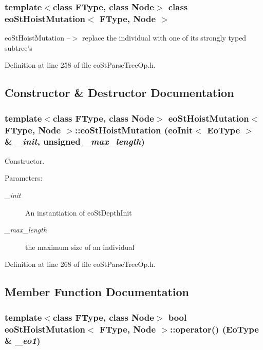 \subsubsection*{template$<$class FType, class Node$>$ class eo\-St\-Hoist\-Mutation$<$ FType, Node $>$}

eo\-St\-Hoist\-Mutation --$>$ replace the individual with one of its strongly typed subtree's 



Definition at line 258 of file eo\-St\-Parse\-Tree\-Op.h.

\subsection{Constructor \& Destructor Documentation}
\subsubsection{\setlength{\rightskip}{0pt plus 5cm}template$<$class FType, class Node$>$ {\bf eo\-St\-Hoist\-Mutation}$<$ FType, Node $>$::{\bf eo\-St\-Hoist\-Mutation} ({\bf eo\-Init}$<$ {\bf Eo\-Type} $>$ \& {\em \_\-init}, unsigned {\em \_\-max\_\-length})\hspace{0.3cm}{\tt  [inline]}}\label{classeo_st_hoist_mutation_a0}


Constructor. 

\begin{Desc}
\item[Parameters:]
\begin{description}
\item[{\em \_\-init}]An instantiation of eo\-St\-Depth\-Init \item[{\em \_\-max\_\-length}]the maximum size of an individual \end{description}
\end{Desc}


Definition at line 268 of file eo\-St\-Parse\-Tree\-Op.h.

\subsection{Member Function Documentation}
\subsubsection{\setlength{\rightskip}{0pt plus 5cm}template$<$class FType, class Node$>$ bool {\bf eo\-St\-Hoist\-Mutation}$<$ FType, Node $>$::operator() ({\bf Eo\-Type} \& {\em \_\-eo1})\hspace{0.3cm}{\tt  [inline]}}\label{classeo_st_hoist_mutation_a3}


